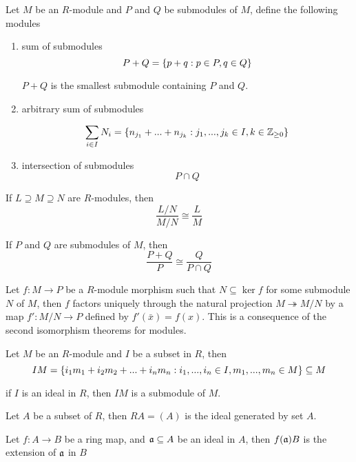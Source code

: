 \begin{definition}
	Let $M$ be an $R$-module and $P$ and $Q$ be submodules of $M$, define the following modules
	\begin{enumerate}
		\item sum of submodules
		$$
			P + Q = \{p + q: p \in P, q \in Q\}
		$$
		
		$P + Q$ is the smallest submodule containing $P$ and $Q$.
		
		\item arbitrary sum of submodules
		
		$$
			\sum_{i \in I} N_i = \{n_{j_1} + ... + n_{j_k}: j_1, ..., j_k \in I, k \in \mathbb{Z}_{\geq 0}\}
		$$
		
		\item intersection of submodules
		$$
			P \cap Q
		$$
	\end{enumerate}
\end{definition}

\begin{proposition}
	If $L \supseteq M \supseteq N$ are $R$-modules, then
	$$
		\frac{L / N}{M / N} \cong \frac{L}{M}
	$$
	
	If $P$ and $Q$ are submodules of $M$, then 
	$$
		\frac{P + Q}{P} \cong \frac{Q}{P \cap Q}
	$$
\end{proposition}

\begin{remark}
	Let $f: M \to P$ be a $R$-module morphism such that $N \subseteq \ker f$ for some submodule $N$ of $M$, then $f$ factors uniquely through the natural projection $M \twoheadrightarrow M / N$ by a map $f': M / N \to P$ defined by $f'(\bar{x}) = f(x)$. This is a consequence of the second isomorphism theorems for modules.
\end{remark}

\begin{remark}[$IM$-notation]
	Let $M$ be an $R$-module and $I$ be a subset in $R$, then
	$$
		IM = \{i_1 m_1 + i_2 m_2 + ... + i_n m_n: i_1, ..., i_n \in I, m_1, ..., m_n \in M\} \subseteq M
	$$
	
	if $I$ is an ideal in $R$, then $IM$ is a submodule of $M$.
	
	Let $A$ be a subset of $R$, then $RA = (A)$ is the ideal generated by set $A$. 
	
	Let $f: A \to B$ be a ring map, and $\mathfrak{a} \subseteq A$ be an ideal in $A$, then $f(\mathfrak{a}) B$ is the extension of $\mathfrak{a}$ in $B$
\end{remark}

